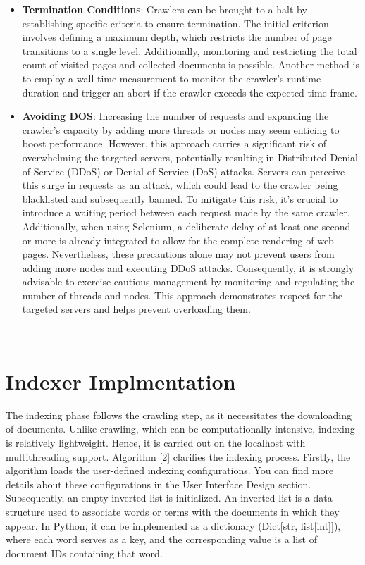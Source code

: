 \begin{itemize}
\item  \textbf{Termination Conditions}: Crawlers can be brought to a halt by establishing specific criteria to ensure termination. The initial criterion involves defining a maximum depth, which restricts the number of page transitions to a single level. Additionally, monitoring and restricting the total count of visited pages and collected documents is possible. Another method is to employ a wall time measurement to monitor the crawler's runtime duration and trigger an abort if the crawler exceeds the expected time frame.

\item  \textbf{Avoiding DOS}: Increasing the number of requests and expanding the crawler's capacity by adding more threads or nodes may seem enticing to boost performance. However, this approach carries a significant risk of overwhelming the targeted servers, potentially resulting in Distributed Denial of Service (DDoS) or Denial of Service (DoS) attacks. Servers can perceive this surge in requests as an attack, which could lead to the crawler being blacklisted and subsequently banned.
To mitigate this risk, it's crucial to introduce a waiting period between each request made by the same crawler. Additionally, when using Selenium, a deliberate delay of at least one second or more is already integrated to allow for the complete rendering of web pages. Nevertheless, these precautions alone may not prevent users from adding more nodes and executing DDoS attacks. Consequently, it is strongly advisable to exercise cautious management by monitoring and regulating the number of threads and nodes. This approach demonstrates respect for the targeted servers and helps prevent overloading them.
\end{itemize}

\\

\section{Indexer Implmentation}

The indexing phase follows the crawling step, as it necessitates the downloading of documents. Unlike crawling, which can be computationally intensive, indexing is relatively lightweight. Hence, it is carried out on the localhost with multithreading support.
Algorithm [2] clarifies the indexing process. Firstly, the algorithm loads the user-defined indexing configurations. You can find more details about these configurations in the User Interface Design section. Subsequently, an empty inverted list is initialized. An inverted list is a data structure used to associate words or terms with the documents in which they appear. In Python, it can be implemented as a dictionary (Dict[str, list[int]]), where each word serves as a key, and the corresponding value is a list of document IDs containing that word.


